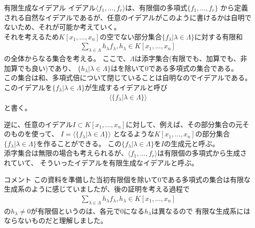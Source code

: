 \begin{frame} {有限生成なイデアル}
	イデアル$\langle f_1, \ldots, f_r \rangle$は、有限個の多項式$\{ f_1, \ldots, f_r \}$
	から定義される自然なイデアルであるが、任意のイデアルがこのように書けるかは自明でないため、それが可能か考えていく。\\
	それを考えるため$K[x_1, \ldots, x_n]$の空でない部分集合$\{f_{\lambda} | \lambda \in \Lambda\}$に対する有限和
	\begin{align*}
		\sum_{\lambda \in \Lambda} h_{\lambda} f_{\lambda}, h_{\lambda} \in K[x_1, \ldots, x_n]
	\end{align*}
	の全体からなる集合を考える。
	ここで、$\Lambda$は添字集合(有限でも、加算でも、非加算でも良い)であり、
	$\{h_{\lambda} | \lambda \in \Lambda\}$はを除いて0である多項式の集合である。\\
	この集合は和、多項式倍について閉じていることは自明なのでイデアルである。\\
	このイデアルを$\{f_{\lambda}|\lambda \in \Lambda\}$が生成するイデアルと呼び
	\begin{align*}
		\langle \{ f_{\lambda} | \lambda \in \Lambda \} \rangle
	\end{align*}
	と書く。

\end{frame}

\begin{frame}
	逆に、任意のイデアル$I \subset K[x_1, \ldots, x_n]$に対して、例えば、その部分集合の元そのものを使って、
	$I=\langle \{  f_{\lambda} | \lambda \in \Lambda \} \rangle$
	となるような$K[x_1, \ldots, x_n]$の部分集合$\{ f_{\lambda} | \lambda \in \Lambda \}$を作ることができる。
	この$\{ f_{\lambda} | \lambda \in \Lambda \}$を$I$の生成元と呼ぶ。\\
	添字集合は無限の場合も考えられるが、$\langle f_1, \ldots, f_r \rangle$は有限個の多項式から生成されていて、
	そういったイデアルを有限生成なイデアルと呼ぶ。\\
	\begin{block} {コメント}
		この資料を準備した当初有限個を除いて0である多項式の集合は有限な生成系のように感じていましたが、後の証明を考える過程で
		\begin{align*}
			\sum_{\lambda \in \Lambda} h_{\lambda} f_{\lambda}, h_{\lambda} \in K[x_1, \ldots, x_n]
		\end{align*}
		の$h_{\lambda} \neq 0$が有限個というのは、各元で0になる$h_{\lambda}$は異なるので
		有限な生成系にはならないものだと理解しました。
	\end{block}
\end{frame}

